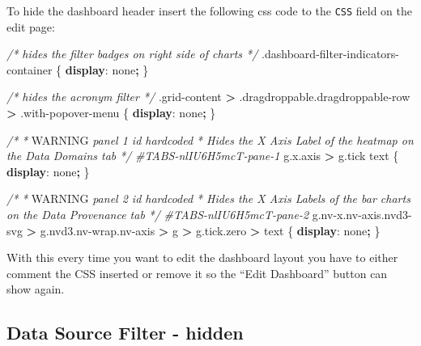 \documentclass[
]{book}
\newenvironment{Shaded}{\begin{snugshade}}{\end{snugshade}}
\newcommand{\AlertTok}[1]{\textcolor[rgb]{0.94,0.16,0.16}{#1}}
\newcommand{\CommentTok}[1]{\textcolor[rgb]{0.56,0.35,0.01}{\textit{#1}}}
\newcommand{\DecValTok}[1]{\textcolor[rgb]{0.00,0.00,0.81}{#1}}
\newcommand{\FunctionTok}[1]{\textcolor[rgb]{0.00,0.00,0.00}{#1}}
\newcommand{\KeywordTok}[1]{\textcolor[rgb]{0.13,0.29,0.53}{\textbf{#1}}}
\newcommand{\NormalTok}[1]{#1}
\newcommand{\OperatorTok}[1]{\textcolor[rgb]{0.81,0.36,0.00}{\textbf{#1}}}
\newcommand{\PreprocessorTok}[1]{\textcolor[rgb]{0.56,0.35,0.01}{\textit{#1}}}
\begin{document}
To hide the dashboard header insert the following css code to the \texttt{CSS} field on the edit page:

\begin{Shaded}
\begin{Highlighting}[]
\CommentTok{/* hides the filter badges on right side of charts */}
\FunctionTok{.dashboard{-}filter{-}indicators{-}container}\NormalTok{ \{}
    \KeywordTok{display}\NormalTok{: }\DecValTok{none}\OperatorTok{;}
\NormalTok{\}}

\CommentTok{/* hides the acronym filter */}
\FunctionTok{.grid{-}content} \OperatorTok{\textgreater{}} \FunctionTok{.dragdroppable.dragdroppable{-}row} \OperatorTok{\textgreater{}} \FunctionTok{.with{-}popover{-}menu}\NormalTok{ \{}
    \KeywordTok{display}\NormalTok{: }\DecValTok{none}\OperatorTok{;}
\NormalTok{\}}

\CommentTok{/*}
\CommentTok{ * }\AlertTok{WARNING}\CommentTok{ panel 1 id hardcoded}
\CommentTok{ * Hides the X Axis Label of the heatmap on the Data Domains tab}
\CommentTok{ */}
\PreprocessorTok{\#TABS{-}nlIU6H5mcT{-}pane{-}1}\NormalTok{ g}\FunctionTok{.x.axis} \OperatorTok{\textgreater{}}\NormalTok{ g}\FunctionTok{.tick}\NormalTok{ text \{}
    \KeywordTok{display}\NormalTok{: }\DecValTok{none}\OperatorTok{;}
\NormalTok{\}}

\CommentTok{/*}
\CommentTok{ * }\AlertTok{WARNING}\CommentTok{ panel 2 id hardcoded}
\CommentTok{ * Hides the X Axis Labels of the bar charts on the Data Provenance tab}
\CommentTok{ */}
\PreprocessorTok{\#TABS{-}nlIU6H5mcT{-}pane{-}2}\NormalTok{ g}\FunctionTok{.nv{-}x.nv{-}axis.nvd3{-}svg} \OperatorTok{\textgreater{}}\NormalTok{ g}\FunctionTok{.nvd3.nv{-}wrap.nv{-}axis} \OperatorTok{\textgreater{}}\NormalTok{ g }\OperatorTok{\textgreater{}}\NormalTok{ g}\FunctionTok{.tick.zero} \OperatorTok{\textgreater{}}\NormalTok{ text \{}
    \KeywordTok{display}\NormalTok{: }\DecValTok{none}\OperatorTok{;}
\NormalTok{\}}
\end{Highlighting}
\end{Shaded}

With this every time you want to edit the dashboard layout you have to either comment the CSS inserted
or remove it so the ``Edit Dashboard'' button can show again.

\hypertarget{data-source-filter---hidden}{%
\subsection*{Data Source Filter - hidden}\label{data-source-filter---hidden}}
\end{document}
